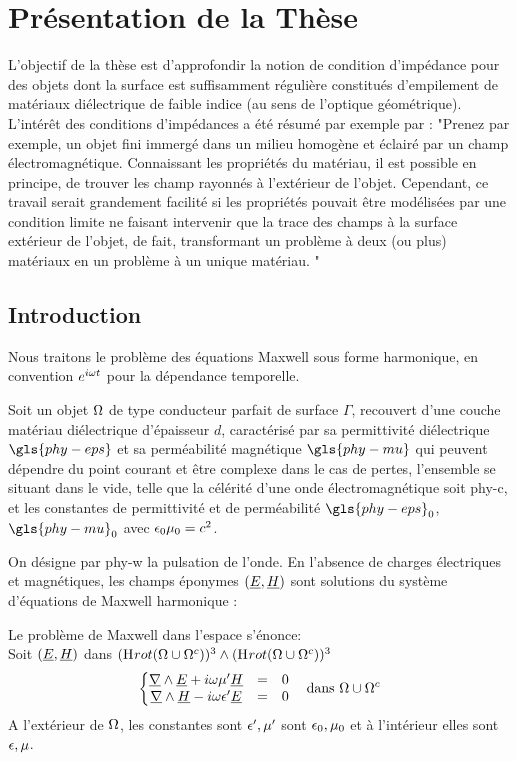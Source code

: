 \section*{Présentation de la Thèse}\label{pre_th}

L'objectif de la thèse est d’approfondir la notion de condition d'impédance pour des objets dont la surface est suffisamment régulière constitués d'empilement de matériaux diélectrique de faible indice (au sens de l'optique géométrique).
\\

L’intérêt des conditions d'impédances a été résumé par exemple par \cite{senior_approximate_1995}:
"Prenez par exemple, un objet fini immergé dans un milieu homogène et éclairé par un champ électromagnétique.
Connaissant les propriétés du matériau, il est possible en principe, de trouver les champ rayonnés à l'extérieur de l'objet.
Cependant, ce travail serait grandement facilité si les propriétés pouvait être modélisées par une condition limite ne faisant intervenir que la trace des champs à la surface extérieur de l'objet, de fait, transformant un problème à deux (ou plus) matériaux en un problème à un unique matériau.
"

\subsection*{Introduction}
Nous traitons le problème des équations Maxwell sous forme harmonique, en convention $e^{i\omega t}$ pour la dépendance temporelle.


Soit un objet $\Omega$ de type conducteur parfait de surface $\Gamma$, recouvert d'une couche matériau diélectrique d'épaisseur $d$, caractérisé par sa permittivité diélectrique $\gls{phy-eps}$ et sa perméabilité magnétique $\gls{phy-mu}$ qui peuvent dépendre du point courant et être complexe dans le cas de pertes, l'ensemble se situant dans le vide, telle que la célérité d'une onde électromagnétique soit \gls{phy-c}, et les constantes de permittivité et de perméabilité $\gls{phy-eps}_0$, $\gls{phy-mu}_0$ avec $\epsilon_0\mu_0 = c^{2}$.


On désigne par \gls{phy-w} la pulsation de l'onde.
En l'absence de charges électriques et magnétiques, les champs éponymes $( \underline{E}, \underline{H} )$ sont solutions du système d'équations de Maxwell harmonique : 

Le problème de Maxwell dans l'espace s'énonce: \\

Soit $(\underline{E},\underline{H})$ dans $(\mathrm{H}_\mathrm{{}}{rot}(\Omega\cup\Omega^c))^3 \wedge (\mathrm{H}_\mathrm{{}}{rot}(\Omega\cup\Omega^c))^3$
\begin{equation}
\label{eq:pres_th:intro:maxwell}
\left\lbrace \begin{matrix}
\underline{\nabla} \wedge \underline{E} + i\omega\mu' \underline{H} &=& 0 \\
\underline{\nabla} \wedge \underline{H} - i\omega\epsilon' \underline{E} &=& 0 \\
\end{matrix} \right.
\quad \text{dans $\Omega\cup\Omega^c$}
\end{equation}
A l'extérieur de $\Omega$, les constantes sont $\epsilon',\mu'$ sont $\epsilon_0,\mu_0$ et à l'intérieur elles sont $\epsilon,\mu$.


